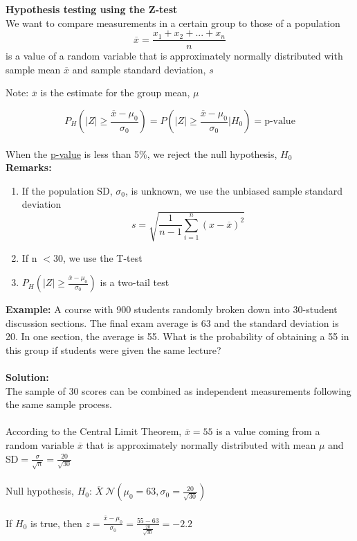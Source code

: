 \documentclass[12pt, letterpaper]{article}
\begin{document}
\textbf{Hypothesis testing using the Z-test} \\
We want to compare measurements in a certain group to those of a population\\
$$\overline{x}=\frac{x_1+x_2+...+x_n}{n}$$ is a value of a random variable that is approximately normally distributed with sample mean $\overline{x}$ and sample standard deviation, $s$ \\
\begin{center}
Note: $\overline{x}$ is the estimate for the group mean, $\mu$
\end{center}
$$P_H(|Z|\geq \frac{\overline{x}-\mu_0}{\sigma_0})= P(|Z|\geq \frac{\overline{x}-\mu_0}{\sigma_0}|H_0) = \text{p-value} $$\\
When the \underline{p-value} is less than 5\%, we reject the null hypothesis, $H_0$\\

\textbf{Remarks:}
\begin{enumerate}
    \item If the population SD, $\sigma_0$, is unknown, we use the unbiased sample standard deviation
    $$s=\sqrt{\frac{1}{n-1}\sum_{i=1}^{n} (x-\overline{x})^2} $$
    \item If n $<30$, we use the T-test
    \item $P_H(|Z|\geq \frac{\overline{x}-\mu_0}{\sigma_0})$ is a two-tail test
\end{enumerate}
\textbf{Example: }A course with 900 students randomly broken down into 30-student discussion sections. The final exam average is 63 and the standard deviation is 20. In one section, the average is 55. What is the probability of obtaining a 55 in this group if students were given the same lecture?\\\\
\textbf{Solution:}\\
The sample of 30 scores can be combined as independent measurements following the same sample process.\\\\
According to the Central Limit Theorem, $\overline{x}=55$ is a value coming from a random variable $\overline{x}$ that is approximately normally distributed with mean $\mu$ and SD$=\frac{\sigma}{\sqrt{n}}=\frac{20}{\sqrt{30}}$\\\\
Null hypothesis, $H_0$: $\overline{X}~\mathcal{N}(\mu_0=63, \sigma_0=\frac{20}{\sqrt{30}})$\\\\
If $H_0$ is true, then $z=\frac{\overline{x}-\mu_0}{\sigma_0}=\frac{55-63}{\frac{20}{\sqrt{30}}}=-2.2$
\end{document}
